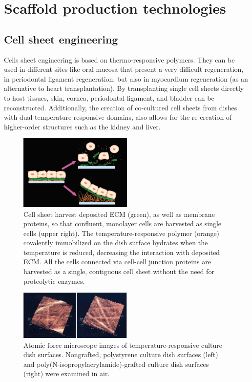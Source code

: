 \section{Scaffold production technologies}

    \subsection{Cell sheet engineering}
    Cells sheet engineering is based on thermo-responsive polymers.
    They can be used in different sites like oral mucosa that present a very difficult regeneration, in periodontal ligament regeneration, but also in myocardium regeneration (as an alternative to heart transplantation).
    By transplanting single cell sheets directly to host tissues, skin, cornea, periodontal ligament, and bladder can be reconstructed.
    Additionally, the creation of co-cultured cell sheets from dishes with dual temperature-responsive domains, also allows for the re-creation of higher-order structures such as the kidney and liver.

    \begin{figure}[H]
            \centering
            \includegraphics[width=0.5\textwidth]{cells_sheet1.png}
        \caption{\label{fig:cells_sheet1} Cell sheet harvest deposited ECM (green), as well as membrane proteins, so that confluent, monolayer cells are harvested as single cells (upper right). The temperature-responsive polymer (orange) covalently immobilized on the dish surface hydrates when the temperature is reduced, decreasing the interaction with deposited ECM. All the cells connected via cell-cell junction proteins are harvested as a single, contiguous cell sheet without the need for proteolytic enzymes.}
    \end{figure}

    \begin{figure}[H]
            \centering
            \includegraphics[width=0.5\textwidth]{cells_sheet2.png}
            \caption{\label{fig:cells_sheet2} Atomic force microscope images of temperature-responsive culture dish surfaces. Nongrafted, polystyrene culture dish surfaces (left) and poly(N-isopropylacrylamide)-grafted culture dish surfaces (right) were examined in air.}
    \end{figure}

